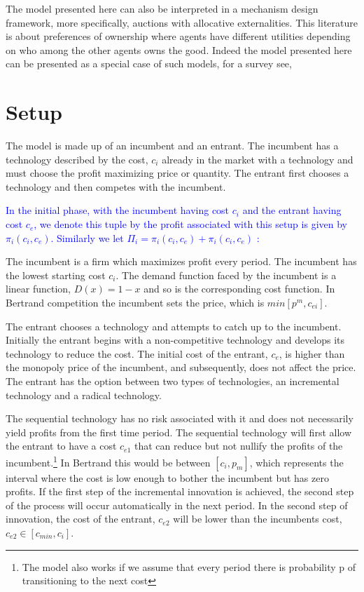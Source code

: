 \documentclass[11pt]{article}
\begin{document}
The model presented here can also be interpreted in a mechanism design framework, more specifically, auctions with allocative externalities. This literature is about preferences of ownership where agents have different utilities depending on who among the other agents owns the good. Indeed the model presented here can be presented as a special case of such models, for a survey see, \cite{Jehiel2005}


\section*{Setup}
The model is made up of an incumbent and an entrant. The incumbent has a technology described by the cost, $c_i$ already in the market with a technology and must choose the profit maximizing price or quantity. The entrant first chooses a technology and then competes with the incumbent. 

\textcolor{blue}{In the initial phase, with the incumbent having cost $c_i$ and the entrant having cost $c_e$, we denote this tuple by  the profit associated with this setup is given by $\pi_i(c_i,c_e)$. Similarly we let $\Pi_i = \pi_i(c_i,c_e) + \pi_i(c_i,c_e)$ : }

The incumbent is a firm which maximizes profit every period. The incumbent has the lowest starting cost $c_i$. The demand function faced by the incumbent is a linear function, $D(x)=1-x$ and so is the corresponding cost function.  In Bertrand competition the incumbent sets the price, which is $min[p^m,c_{ei}]$. 


The entrant chooses a technology and attempts to catch up to the incumbent. Initially the entrant begins with a non-competitive technology and develops its technology to reduce the cost. The initial cost of the entrant, $c_e$, is higher than the monopoly price of the incumbent, and subsequently, does not affect the price. The entrant has the option between two types of technologies, an incremental technology and a radical technology. 


The sequential technology has no risk associated with it and does not necessarily yield profits from the first time period.  The sequential technology will first allow the entrant to have a cost $c_{e1}$ that can reduce but not nullify the profits of the incumbent.\footnote{The model also works if we assume that every period there is probability p of transitioning to the next cost} In Bertrand this would be between $ [c_i,p_m]$, which represents the interval where the cost is low enough to bother the incumbent but has zero profits. If the first step of the incremental innovation is achieved, the second step of the process will occur automatically in the next period. In the second step of innovation, the cost of the entrant, $c_{e2}$ will be lower than the incumbents cost, $c_{e2}\in [c_{min},c_i]$. 
\end{document}
